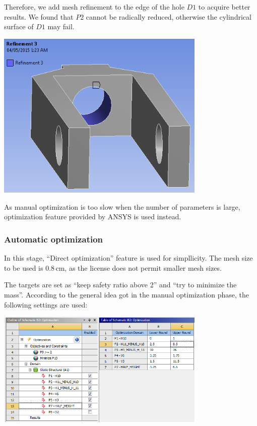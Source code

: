 \documentclass[a4paper,14pt]{extarticle}
\newcommand{\cm}{\,\si{\centi\meter}}
\begin{document}
Therefore, we add mesh refinement to the edge of the hole $D1$ to acquire better results. We found that $P2$ cannot be radically reduced, otherwise the cylindrical surface of $D1$ may fail.

\begin{center}
\includegraphics[width=0.75\textwidth]{REF3_SELF.PNG}
\end{center}

As manual optimization is too slow when the number of parameters is large, optimization feature provided by ANSYS is used instead.

\subsubsection{Automatic optimization}
In this stage, ``Direct optimization'' feature is used for simpllicity. The mesh size to be used is $0.8 \cm$, as the license does not permit smaller mesh sizes. 

The targets are set as ``keep safety ratio above 2'' and ``try to minimize the mass''. According to the general idea got in the manual optimization phase, the following settings are used:

\begin{center}
\includegraphics[width=0.75\textwidth]{OPT_BEFORE.PNG}
\end{center}
\end{document}

